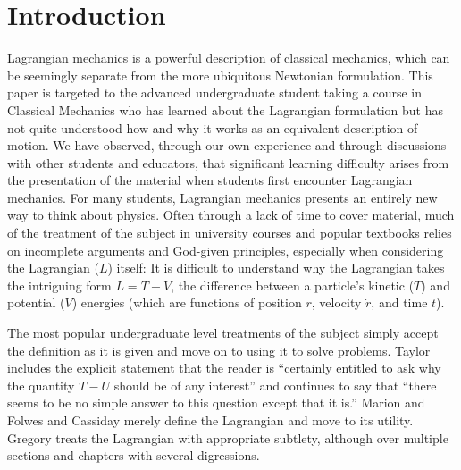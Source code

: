 \documentclass[prb,preprint]{revtex4-1}
\begin{document}
\maketitle



\section{Introduction}\label{introduction}

Lagrangian mechanics is a powerful description of classical mechanics, which can be seemingly separate from the more ubiquitous Newtonian formulation. This paper is targeted to the advanced undergraduate student taking a course in Classical Mechanics who has learned about the Lagrangian formulation but has not quite understood how and why it works as an equivalent description of motion. We have observed, through our own experience and through discussions with other students and educators, that significant learning difficulty arises from the presentation of the material when students first encounter Lagrangian mechanics. For many students, Lagrangian mechanics presents an entirely new way to think about physics. Often through a lack of time to cover material, much of the treatment of the subject in university courses and popular textbooks relies on incomplete arguments and God-given principles, especially when considering the Lagrangian ($L$) itself: It is difficult to understand why the Lagrangian takes the intriguing form $L=T-V$, the difference between a particle's kinetic ($T$) and potential ($V$) energies (which are functions of position $r$, velocity $\dot{r}$, and time $t$). 

The most popular undergraduate level treatments of the subject simply accept the definition as it is given and move on to using it to solve problems. Taylor\cite[p.~238]{taylor2005classical} includes the explicit statement that the reader is ``certainly entitled to ask why the quantity $T-U$ should be of any interest'' and continues to say that ``there seems to be no simple answer to this question except that it is.'' Marion \cite[p.~198-199]{marion1970classical} and Folwes and Cassiday \cite[p.~393]{fowles1999analytical} merely define the Lagrangian and move to its utility. Gregory\cite[p.~348]{gregory2006classical} treats the Lagrangian with appropriate subtlety, although over multiple sections and chapters with several digressions.
\end{document}
